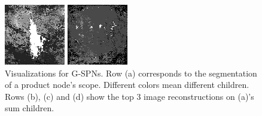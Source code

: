 \documentclass{article}
\begin{document}
\begin{figure}[t]
\begin{minipage}[c]{.21\linewidth}
  \end{minipage}
  \begin{minipage}[c]{.21\linewidth}
    \centering\centerline{\includegraphics[width=\linewidth]{imgs/gens_cal/saxophone/sums/0_2.png}}
  \end{minipage}
  \begin{minipage}[c]{.21\linewidth}
    \centering\centerline{\includegraphics[width=\linewidth]{imgs/gens_cal/stop/sums/0_2.png}}
  \end{minipage}
  \caption{Visualizations for G-SPNs. Row (a) corresponds to the segmentation of a product node's
    scope.  Different colors mean different children. Rows (b), (c) and (d) show the top 3 image
    reconstructions on (a)'s sum children.\label{fig:g-cal}}
\end{figure}
\end{document}
